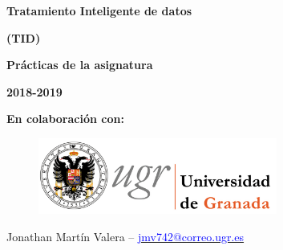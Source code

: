 \documentclass[spanish,]{article}
\begin{document}
	
	\thispagestyle{empty}
	
	\begin{center} \huge \textbf{Tratamiento Inteligente de datos} \end{center}
	
	\vspace{0.3cm}
	
	\begin{center} \huge \textbf{(TID)} \end{center}
	
	\vspace{1.7cm}
	
	\begin{center} \Large \textbf{Prácticas de la asignatura} \end{center}
	
	\vspace{0.2cm}
	
	\begin{center} \large \textbf{2018-2019} \end{center}
	
	\vspace{2.5cm}
	
	\textbf{\large En colaboración con:} \vspace{0.2cm}
	
	\begin{figure}[h]
		\centering
		\includegraphics[width=0.7\textwidth]{images/logoUGR.jpg}
		\label{imagen2}
	\end{figure}
	
	\vspace{2.5cm}
	
	
			
	\begin{flushright}
		Jonathan Martín Valera -- 
		\href{mailto:jmv742@correo.ugr.es}{\textcolor{blue}{jmv742@correo.ugr.es}}
	\end{flushright}
		
	\vspace{0.15cm}
	
	\newpage
	
\end{document}
